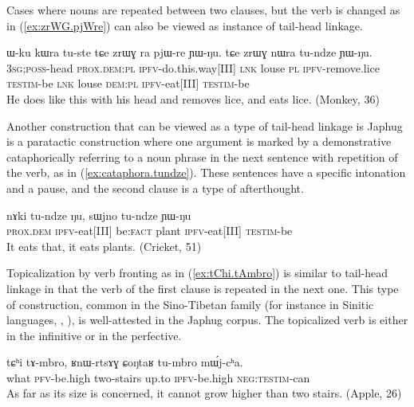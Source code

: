 \documentclass[oldfontcommands,oneside,a4paper,11pt]{article}
\newcommand{\ipa}[1]{{\phon \mbox{#1}}} %
\newcommand{\refb}[1]{(\ref{#1})}
\begin{document}
Cases where nouns are repeated between two clauses, but the verb is changed as in \refb{ex:zrWG.pjWre} can also be viewed as instance of tail-head linkage.

\begin{exe}
\ex \label{ex:zrWG.pjWre}
\gll
\ipa{ɯ-ku} 	\ipa{kɯra} 	\ipa{tu-ste} 	\ipa{tɕe} 	\ipa{zrɯɣ} 	\ipa{ra} 	\ipa{pjɯ-re} 	\ipa{ɲɯ-ŋu.} 	\ipa{tɕe} 	\ipa{zrɯɣ} 	\ipa{nɯra} 	\ipa{tu-ndze} 	\ipa{ɲɯ-ŋu.} \\
\textsc{3sg;poss}-head \textsc{prox.dem:pl} \textsc{ipfv}-do.this.way[III] \textsc{lnk} louse \textsc{pl} \textsc{ipfv}-remove.lice \textsc{testim}-be  \textsc{lnk} louse \textsc{dem:pl}  \textsc{ipfv}-eat[III] \textsc{testim}-be \\
\glt He does like this with his head and removes lice, and eats lice. (Monkey, 36)
 \end{exe}

 
 

Another construction that can be viewed as a type of tail-head linkage is Japhug is a paratactic construction where one argument is marked by a demonstrative cataphorically referring to a noun phrase in the next sentence with repetition of the verb, as in \refb{ex:cataphora.tundze}. These sentences have a specific intonation and a pause, and the second clause is a type of afterthought.

\begin{exe}
\ex \label{ex:cataphora.tundze}
\gll
\ipa{nɤki} 	\ipa{tu-ndze} 	\ipa{ŋu,} 	\ipa{sɯjno} 	\ipa{tu-ndze} 	\ipa{ɲɯ-ŋu} \\
\textsc{prox.dem} \textsc{ipfv}-eat[III] be:\textsc{fact} plant \textsc{ipfv}-eat[III] \textsc{testim}-be \\
\glt It eats that, it eats plants. (Cricket, 51)
\end{exe}
 
Topicalization by verb fronting as in \refb{ex:tChi.tAmbro} is similar to tail-head linkage in that the verb of the first clause is repeated in the next one. This type of construction, common in the Sino-Tibetan family (for instance in Sinitic languages, \citealt{paris81syntaxe}, \citealt[76]{matthews94cantonese}), is well-attested in the Japhug corpus. The topicalized verb is either in the infinitive or in the perfective.

\begin{exe}
\ex \label{ex:tChi.tAmbro}
\gll
\ipa{tɕʰi} 	\ipa{tɤ-mbro,} 	\ipa{ʁnɯ-rtsɤɣ} 	\ipa{ɕoŋtaʁ} 	\ipa{tu-mbro} 	\ipa{mɯ́j-cʰa.}\\
what \textsc{pfv}-be.high two-stairs up.to \textsc{ipfv}-be.high \textsc{neg:testim}-can\\
\glt As far as its size is concerned, it cannot grow higher than two stairs. (Apple, 26)
\end{exe}
\end{document}
